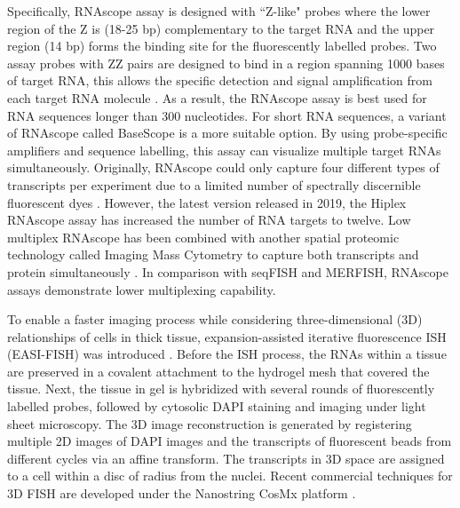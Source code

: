 Specifically, RNAscope assay is designed with ``Z-like" probes where the lower region of the Z is (18-25 bp) complementary to the target RNA and the upper region (14 bp) forms the binding site for the fluorescently labelled probes. Two assay probes with ZZ pairs are designed to bind in a region spanning 1000 bases of target RNA, this allows the specific detection and signal amplification from each target RNA molecule \cite{solanki2020visualization}. As a result, the RNAscope assay is best used for RNA sequences longer than 300 nucleotides. For short RNA sequences, a variant of RNAscope called BaseScope is a more suitable option. By using probe-specific amplifiers and sequence labelling, this assay can visualize multiple target RNAs simultaneously. Originally, RNAscope could only capture four different types of transcripts per experiment due to a limited number of spectrally discernible fluorescent dyes \cite{wang2012rnascope}. However, the latest version released in 2019, the Hiplex RNAscope assay has increased the number of RNA targets to twelve. Low multiplex RNAscope has been combined with another spatial proteomic technology called Imaging Mass Cytometry to capture both transcripts and protein simultaneously \cite{schulz2018simultaneous}. In comparison with seqFISH and MERFISH, RNAscope assays demonstrate lower multiplexing capability. 

To enable a faster imaging process while considering three-dimensional (3D) relationships of cells in thick tissue, expansion-assisted iterative fluorescence ISH (EASI-FISH) was introduced \cite{wang2021easi, borm2022scalable}. Before the ISH process, the RNAs within a tissue are preserved in a covalent attachment to the hydrogel mesh that covered the tissue. Next, the tissue in gel is hybridized with several rounds of fluorescently labelled probes, followed by cytosolic DAPI staining and imaging under light sheet microscopy. The 3D image reconstruction is generated by registering multiple 2D images of DAPI images and the transcripts of fluorescent beads from different cycles via an affine transform. The transcripts in 3D space are assigned to a cell within a disc of radius from the nuclei. Recent commercial techniques for 3D FISH are developed under the Nanostring CosMx platform \cite{he2022high}.  

